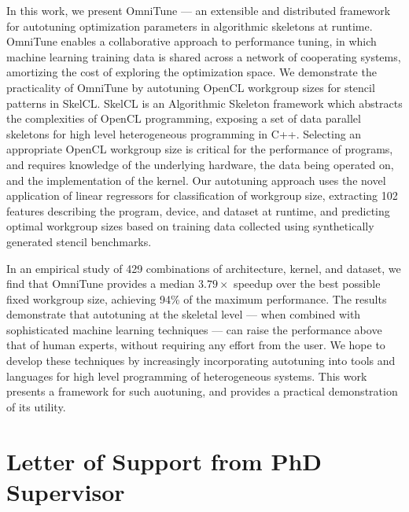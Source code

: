 In this work, we present OmniTune --- an extensible and distributed
framework for autotuning optimization parameters in algorithmic
skeletons at runtime. OmniTune enables a collaborative approach to
performance tuning, in which machine learning training data is shared
across a network of cooperating systems, amortizing the cost of
exploring the optimization space. We demonstrate the practicality of
OmniTune by autotuning OpenCL workgroup sizes for stencil patterns in
SkelCL. SkelCL is an Algorithmic Skeleton framework which abstracts
the complexities of OpenCL programming, exposing a set of data
parallel skeletons for high level heterogeneous programming in C++.
Selecting an appropriate OpenCL workgroup size is critical for the
performance of programs, and requires knowledge of the underlying
hardware, the data being operated on, and the implementation of the
kernel. Our autotuning approach uses the novel application of linear
regressors for classification of workgroup size, extracting 102
features describing the program, device, and dataset at runtime, and
predicting optimal workgroup sizes based on training data collected
using synthetically generated stencil benchmarks.

In an empirical study of 429 combinations of architecture, kernel, and
dataset, we find that OmniTune provides a median $3.79\times$ speedup
over the best possible fixed workgroup size, achieving 94\% of the
maximum performance. The results demonstrate that autotuning at the
skeletal level --- when combined with sophisticated machine learning
techniques --- can raise the performance above that of human experts,
without requiring any effort from the user. We hope to develop these
techniques by increasingly incorporating autotuning into tools and
languages for high level programming of heterogeneous systems. This
work presents a framework for such auotuning, and provides a practical
demonstration of its utility.

\newpage



\newpage

\section*{Letter of Support from PhD Supervisor}



